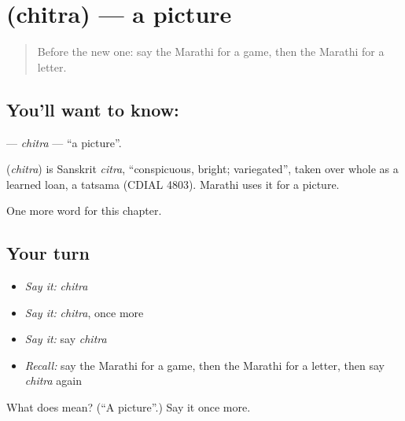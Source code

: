 \section[\texorpdfstring{\mr{चित्र} (chitra)}{चित्र (chitra)}]{ (chitra) — a picture}

\label{lesson:MR-C95-chitra}



\begin{quote}
Before the new one: say the Marathi for a game, then the Marathi for a letter.
\end{quote}

\subsection*{You'll want to know: }
\textbf{} — \emph{chitra} — \textquotedblleft{}a picture\textquotedblright{}.

\begin{cousinweb}
\textbf{} (\emph{chitra}) is Sanskrit \emph{citra}, \textquotedblleft{}conspicuous, bright; variegated\textquotedblright{}, taken over whole as a learned loan, a tatsama (CDIAL 4803). Marathi uses it for a picture.
\end{cousinweb}

\begin{grammarlens}[title={What you've built}]
One more word for this chapter.
\end{grammarlens}

\subsection*{Your turn}
\begin{itemize}
\raggedright
  \item \emph{Say it:} \emph{chitra}
  \item \emph{Say it:} \emph{chitra}, once more
  \item \emph{Say it:} say \emph{chitra}
  \item \emph{Recall:} say the Marathi for a game, then the Marathi for a letter, then say \emph{chitra} again
\end{itemize}

\begin{tcolorbox}[breakable,colback=teal!4,colframe=teal!35!black,title={Before you move on}]
What does  mean? (\textquotedblleft{}A picture\textquotedblright{}.) Say it once more.
\end{tcolorbox}
